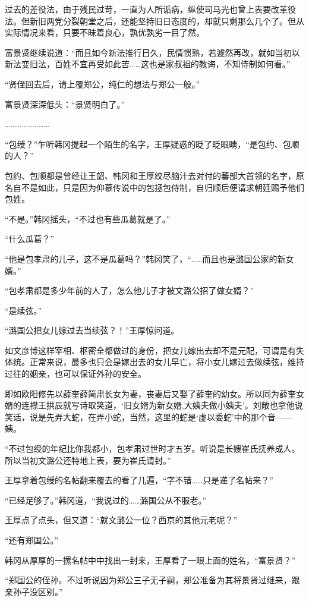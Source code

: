 过去的差役法，由于残民过苛，一直为人所诟病，纵使司马光也曾上表要改革役法。但新旧两党分裂朝堂之后，还能坚持旧日态度的，却就只剩那么几个了。但从实际情况来看，只要不昧着良心，孰优孰劣一目了然。

富景贤继续说道：“而且如今新法推行日久，民情惯熟，若遽然再改，就如当初以新法变旧法，百姓不宜再受如此苦……这也是家叔祖的教诲，不知侍制如何看。”

“贤侄回去后，请上覆郑公，纯仁的想法与郑公一般。”

富景贤深深低头：“景贤明白了。”

……………………

“包绶？”乍听韩冈提起一个陌生的名字，王厚疑惑的眨了眨眼睛，“是包约、包顺的人？”

包约、包顺都是曾经让王韶、韩冈和王厚绞尽脑汁去对付的蕃部大首领的名字，原名自不是如此，只是因为仰慕传说中的包拯包侍制，自归顺后便请求朝廷赐予他们包姓。

“不是。”韩冈摇头，“不过也有些瓜葛就是了。”

“什么瓜葛？”

“他是包孝肃的儿子，这不是瓜葛吗？”韩冈笑了，“……而且也是潞国公家的新女婿。”

“包孝肃都是多少年前的人了，怎么他儿子才被文潞公招了做女婿？”

“是续弦。”

“潞国公把女儿嫁过去当续弦？！”王厚惊问道。

如文彦博这样宰相、枢密全都做过的身份，把女儿嫁出去却不是元配，可谓是有失体统。正常来说，最多也只会是嫁出去的女儿早亡，将小女儿嫁过去做续弦，维持过往的姻亲，也可以保证外孙的安全。

即如欧阳修先以薛奎薛简肃长女为妻，丧妻后又娶了薛奎的幼女。所以同为薛奎女婿的连襟王拱辰就写诗取笑道，‘旧女婿为新女婿,大姨夫做小姨夫’。刘敞也拿他说笑话，说是先弄大蛇，在弄小蛇，当然，这里的蛇是‘虚以委蛇’中的那个音——姨。

“不过包绶的年纪比你我都小，包孝肃过世时才五岁。听说是长嫂崔氏抚养成人。所以当初文潞公还特地上表，要为崔氏请封。”

王厚拿着包绶的名帖翻来覆去的看了几遍，“字不错……只是递了名帖来？”

“已经足够了。”韩冈道，“我说过的……潞国公从不服老。”

王厚点了点头，但又道：“就文潞公一位？西京的其他元老呢？”

“还有郑国公。”

韩冈从厚厚的一摞名帖中中找出一封来，王厚看了一眼上面的姓名，“富景贤？”

“郑国公的侄孙。不过听说因为郑公三子无子嗣，郑公准备为其将景贤过继来，跟亲孙子没区别。”

